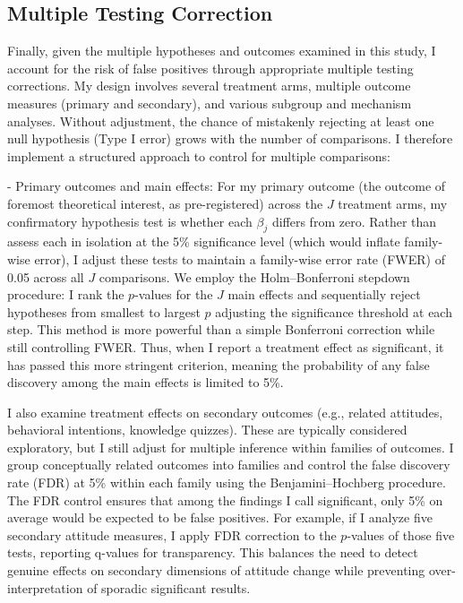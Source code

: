 \documentclass[12pt, american]{article}
\begin{document}
\subsection{Multiple Testing Correction}
Finally, given the multiple hypotheses and outcomes examined in this study, I account for the risk of false positives through appropriate multiple testing corrections. My design involves several treatment arms, multiple outcome measures (primary and secondary), and various subgroup and mechanism analyses. Without adjustment, the chance of mistakenly rejecting at least one null hypothesis (Type I error) grows with the number of comparisons. I therefore implement a structured approach to control for multiple comparisons:

- Primary outcomes and main effects: For my primary outcome (the outcome of foremost theoretical interest, as pre-registered) across the $J$ treatment arms, my confirmatory hypothesis test is whether each $\beta_j$ differs from zero. Rather than assess each in isolation at the 5\% significance level (which would inflate family-wise error), I adjust these tests to maintain a family-wise error rate (FWER) of 0.05 across all $J$ comparisons. We employ the Holm–Bonferroni stepdown procedure: I rank the $p$-values for the $J$ main effects and sequentially reject hypotheses from smallest to largest $p$ adjusting the significance threshold at each step. This method is more powerful than a simple Bonferroni correction while still controlling FWER. Thus, when I report a treatment effect as significant, it has passed this more stringent criterion, meaning the probability of any false discovery among the main effects is limited to 5\%.

I also examine treatment effects on secondary outcomes (e.g., related attitudes, behavioral intentions, knowledge quizzes). These are typically considered exploratory, but I still adjust for multiple inference within families of outcomes. I group conceptually related outcomes into families and control the false discovery rate (FDR) at 5\% within each family using the Benjamini–Hochberg procedure. The FDR control ensures that among the findings I call significant, only 5\% on average would be expected to be false positives. For example, if I analyze five secondary attitude measures, I apply FDR correction to the $p$-values of those five tests, reporting q-values for transparency. This balances the need to detect genuine effects on secondary dimensions of attitude change while preventing over-interpretation of sporadic significant results.
\end{document}
